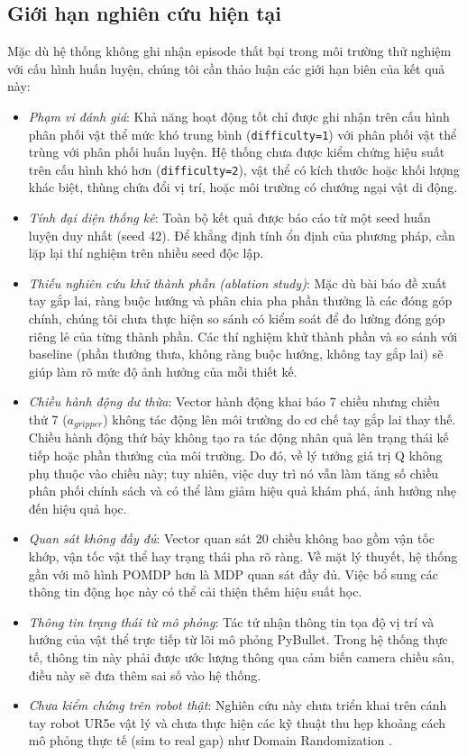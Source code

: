 \documentclass[conference]{IEEEtran}
\begin{document}
\subsection{Giới hạn nghiên cứu hiện tại}
Mặc dù hệ thống không ghi nhận episode thất bại trong môi trường thử nghiệm với cấu hình huấn luyện, chúng tôi cần thảo luận các giới hạn biên của kết quả này:
\begin{itemize}
    \item \textit{Phạm vi đánh giá}: Khả năng hoạt động tốt chỉ được ghi nhận trên cấu hình phân phối vật thể mức khó trung bình (\texttt{difficulty=1}) với phân phối vật thể trùng với phân phối huấn luyện. Hệ thống chưa được kiểm chứng hiệu suất trên cấu hình khó hơn (\texttt{difficulty=2}), vật thể có kích thước hoặc khối lượng khác biệt, thùng chứa đổi vị trí, hoặc môi trường có chướng ngại vật di động.
    \item \textit{Tính đại diện thống kê}: Toàn bộ kết quả được báo cáo từ một seed huấn luyện duy nhất (seed 42). Để khẳng định tính ổn định của phương pháp, cần lặp lại thí nghiệm trên nhiều seed độc lập.
    \item \textit{Thiếu nghiên cứu khử thành phần (ablation study)}: Mặc dù bài báo đề xuất tay gắp lai, ràng buộc hướng và phân chia pha phần thưởng là các đóng góp chính, chúng tôi chưa thực hiện so sánh có kiểm soát để đo lường đóng góp riêng lẻ của từng thành phần. Các thí nghiệm khử thành phần và so sánh với baseline (phần thưởng thưa, không ràng buộc hướng, không tay gắp lai) sẽ giúp làm rõ mức độ ảnh hưởng của mỗi thiết kế.
    \item \textit{Chiều hành động dư thừa}: Vector hành động khai báo 7 chiều nhưng chiều thứ 7 ($a_{gripper}$) không tác động lên môi trường do cơ chế tay gắp lai thay thế. Chiều hành động thứ bảy không tạo ra tác động nhân quả lên trạng thái kế tiếp hoặc phần thưởng của môi trường. Do đó, về lý tưởng giá trị Q không phụ thuộc vào chiều này; tuy nhiên, việc duy trì nó vẫn làm tăng số chiều phân phối chính sách và có thể làm giảm hiệu quả khám phá, ảnh hưởng nhẹ đến hiệu quả học.
    \item \textit{Quan sát không đầy đủ}: Vector quan sát 20 chiều không bao gồm vận tốc khớp, vận tốc vật thể hay trạng thái pha rõ ràng. Về mặt lý thuyết, hệ thống gần với mô hình POMDP hơn là MDP quan sát đầy đủ. Việc bổ sung các thông tin động học này có thể cải thiện thêm hiệu suất học.
    \item \textit{Thông tin trạng thái từ mô phỏng}: Tác tử nhận thông tin tọa độ vị trí và hướng của vật thể trực tiếp từ lõi mô phỏng PyBullet. Trong hệ thống thực tế, thông tin này phải được ước lượng thông qua cảm biến camera chiều sâu, điều này sẽ đưa thêm sai số vào hệ thống.
    \item \textit{Chưa kiểm chứng trên robot thật}: Nghiên cứu này chưa triển khai trên cánh tay robot UR5e vật lý và chưa thực hiện các kỹ thuật thu hẹp khoảng cách mô phỏng thực tế (sim to real gap) như Domain Randomization \cite{tobin2017domain}.
\end{itemize}
\end{document}
